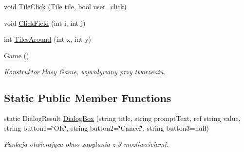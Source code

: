 \begin{DoxyCompactItemize}
\item 
void \mbox{\hyperlink{class_saper_1_1_game_ad7088e52259cb63a068213bf2856eebb}{Tile\+Click}} (\mbox{\hyperlink{class_saper_1_1_tile}{Tile}} tile, bool user\+\_\+click)
\item 
void \mbox{\hyperlink{class_saper_1_1_game_a87c8f7562e380781913a182aab6e093d}{Click\+Field}} (int i, int j)
\item 
int \mbox{\hyperlink{class_saper_1_1_game_a77640c9261a148c9e68f28b0b02b57c8}{Tiles\+Around}} (int x, int y)
\item 
\mbox{\label{class_saper_1_1_game_a9d694a044fb311e088ce585b716a9d84}} 
\mbox{\hyperlink{class_saper_1_1_game_a9d694a044fb311e088ce585b716a9d84}{Game}} ()
\begin{DoxyCompactList}\small\item\em Konstruktor klasy \mbox{\hyperlink{class_saper_1_1_game}{Game}}, wywoływany przy tworzeniu. \end{DoxyCompactList}\end{DoxyCompactItemize}
\subsection*{Static Public Member Functions}
\begin{DoxyCompactItemize}
\item 
\mbox{\label{class_saper_1_1_game_a807f8f51c7b6f8b63382b7eb098b5fab}} 
static Dialog\+Result \mbox{\hyperlink{class_saper_1_1_game_a807f8f51c7b6f8b63382b7eb098b5fab}{Dialog\+Box}} (string title, string prompt\+Text, ref string value, string button1=\char`\"{}OK\char`\"{}, string button2=\char`\"{}Cancel\char`\"{}, string button3=null)
\begin{DoxyCompactList}\small\item\em Funkcja otwierająca okno zapytania z 3 mozliwościami. \end{DoxyCompactList}\end{DoxyCompactItemize}
